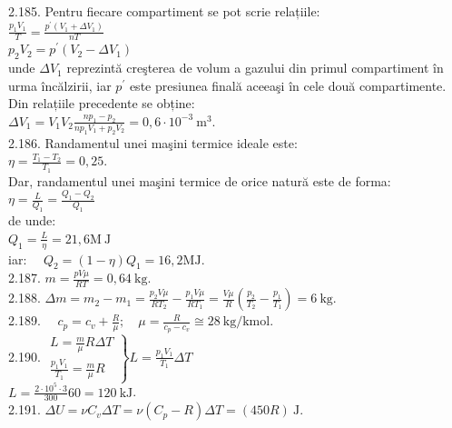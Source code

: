 2.185. Pentru fiecare compartiment se pot scrie relațiile:\\ $\frac{p_{1} V_{1}}{T}=\frac{p^{\prime}\left(V_{1}+\Delta V_{1}\right)}{n T}$ \\ $p_{2} V_{2}=p^{\prime}\left(V_{2}-\Delta V_{1}\right)$\\ unde $\Delta V_{1}$ reprezintă creşterea de volum a gazului din primul compartiment în urma încălzirii, iar $p^{\prime}$ este presiunea finală aceeaşi în cele două compartimente.\\ Din relațiile precedente se obține:\\ $\Delta V_{1}=V_{1} V_{2} \frac{n p_{1}-p_{2}}{n p_{1} V_{1}+p_{2} V_{2}}=0,6 \cdot 10^{-3} \mathrm{~m}^{3}$.\\

2.186. Randamentul unei maşini termice ideale este:\\ $\eta=\frac{T_{1}-T_{2}}{T_{1}}=0,25$.\\ Dar, randamentul unei maşini termice de orice natură este de forma:\\ $\eta=\frac{L}{Q_{1}}=\frac{Q_{1}-Q_{2}}{Q_{1}}$\\ de unde:\\ $Q_{1}=\frac{L}{\eta}=21,6 \mathrm{M} \mathrm{~J}$\\ iar: $\quad Q_{2}=(1-\eta) Q_{1}=16,2 \mathrm{MJ}$.\\

2.187. $m=\frac{p V \mu}{R T}=0,64 \mathrm{~kg}$.\\

2.188. $\Delta m=m_{2}-m_{1}=\frac{p_{2} V \mu}{R T_{2}}-\frac{p_{1} V \mu}{R T_{1}}=\frac{V \mu}{R}\left(\frac{p_{2}}{T_{2}}-\frac{p_{1}}{T_{1}}\right)=6 \mathrm{~kg}$.\\

2.189. $\quad c_{p}=c_{v}+\frac{R}{\mu} ; \quad \mu=\frac{R}{c_{p}-c_{v}} \cong 28 \mathrm{~kg} / \mathrm{kmol}$.\\

2.190. $\left.\begin{array}{l}L=\frac{m}{\mu} R \Delta T \\ \frac{p_{1} V_{1}}{T_{1}}=\frac{m}{\mu} R \end{array}\right\} L=\frac{p_{1} V_{1}}{T_{1}} \Delta T$ \\ $L=\frac{2 \cdot 10^{5} \cdot 3}{300} 60=120 \mathrm{~kJ}$.\\

2.191. $\Delta U=\nu C_{v} \Delta T=\nu \left(C_{p}-R\right) \Delta T=(450 R) \mathrm{~J}$.\\

